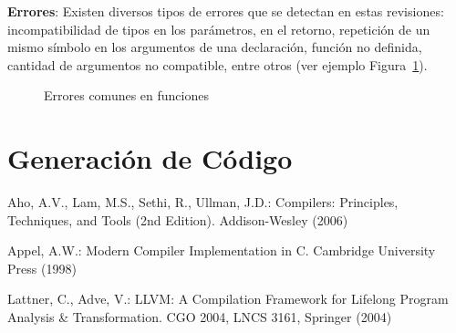 \documentclass{llncs}
\begin{document}
\textbf{Errores}: Existen diversos tipos de errores que se detectan en estas revisiones: incompatibilidad de tipos en los parámetros, en el retorno, repetición de un 
mismo símbolo en los argumentos de una declaración, función no definida, cantidad de argumentos no compatible, entre otros (ver ejemplo Figura~\ref{fig:errores_3}).
\begin{figure}[h]
\centering
\caption{Errores comunes en funciones}
\label{fig:errores_3}
\end{figure}

\vspace{10pt}
\section{Generación de Código}
\vspace{10pt}
\begin{thebibliography}{9}
Aho, A.V., Lam, M.S., Sethi, R., Ullman, J.D.: 
Compilers: Principles, Techniques, and Tools (2nd Edition). 
Addison-Wesley (2006)

Appel, A.W.: Modern Compiler Implementation in C. 
Cambridge University Press (1998)

Lattner, C., Adve, V.: 
LLVM: A Compilation Framework for Lifelong Program Analysis \& Transformation. 
CGO 2004, LNCS 3161, Springer (2004)
\end{thebibliography}
\end{document}
